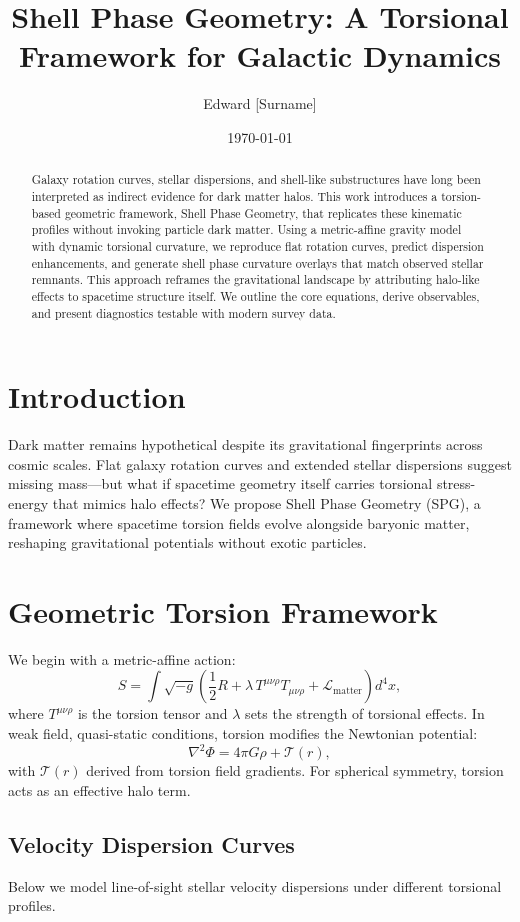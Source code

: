\documentclass[11pt]{article}
\title{Shell Phase Geometry: A Torsional Framework for Galactic Dynamics}
\author[1]{Edward [Surname]}
\affil[1]{Unaffiliated, Brooklyn, NY, United States \\ \texttt{[email@domain.com]}}
\date{\today}
\begin{document}
\maketitle

\begin{abstract}
Galaxy rotation curves, stellar dispersions, and shell-like substructures have long been interpreted as indirect evidence for dark matter halos. This work introduces a torsion-based geometric framework, Shell Phase Geometry, that replicates these kinematic profiles without invoking particle dark matter. Using a metric-affine gravity model with dynamic torsional curvature, we reproduce flat rotation curves, predict dispersion enhancements, and generate shell phase curvature overlays that match observed stellar remnants. This approach reframes the gravitational landscape by attributing halo-like effects to spacetime structure itself. We outline the core equations, derive observables, and present diagnostics testable with modern survey data.
\end{abstract}

\section{Introduction}
Dark matter remains hypothetical despite its gravitational fingerprints across cosmic scales. Flat galaxy rotation curves and extended stellar dispersions suggest missing mass—but what if spacetime geometry itself carries torsional stress-energy that mimics halo effects? We propose Shell Phase Geometry (SPG), a framework where spacetime torsion fields evolve alongside baryonic matter, reshaping gravitational potentials without exotic particles.

\section{Geometric Torsion Framework}
We begin with a metric-affine action:
\[
S = \int \sqrt{-g} \left( \frac{1}{2} R + \lambda \, T^{\mu\nu\rho} T_{\mu\nu\rho} + \mathcal{L}_\text{matter} \right) d^4x,
\]
where \( T^{\mu\nu\rho} \) is the torsion tensor and \( \lambda \) sets the strength of torsional effects. In weak field, quasi-static conditions, torsion modifies the Newtonian potential:
\[
\nabla^2 \Phi = 4\pi G \rho + \mathcal{T}(r),
\]
with \( \mathcal{T}(r) \) derived from torsion field gradients. For spherical symmetry, torsion acts as an effective halo term.

\subsection*{Velocity Dispersion Curves}
Below we model line-of-sight stellar velocity dispersions under different torsional profiles.
\end{document}
